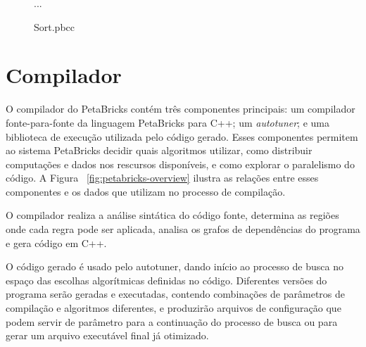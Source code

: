 \documentclass[a4paper, 11pt, twoside]{article}
\begin{document}
\begin{figure}[H]
    
    ...
    
    \centering
    \caption{Sort.pbcc}
    \label{fig:sortpbcc}
\end{figure}

\section{Compilador}

O compilador do PetaBricks contém três componentes principais: um 
compilador fonte-para-fonte da linguagem PetaBricks para C++; um 
\emph{autotuner}; e uma biblioteca de execução utilizada pelo código gerado.
Esses componentes permitem ao sistema PetaBricks decidir quais algoritmos 
utilizar, como distribuir computações e dados nos rescursos disponíveis, e como
explorar o paralelismo do código. A Figura ~\ref{fig:petabricks-overview} 
ilustra as relações entre esses componentes e os dados que utilizam no processo
de compilação.

O compilador realiza a análise sintática do código
fonte, determina as regiões onde cada regra pode ser aplicada, analisa
os grafos de dependências do programa e gera código em C++.

O código gerado é usado pelo autotuner, dando início ao processo de busca no 
espaço das escolhas algorítmicas definidas no código. Diferentes versões
do programa serão geradas e executadas, contendo combinações de parâmetros de
compilação e algoritmos diferentes, e produzirão arquivos de configuração que
podem servir de parâmetro para a continuação do processo de busca ou para gerar
um arquivo executável final já otimizado.
\end{document}
